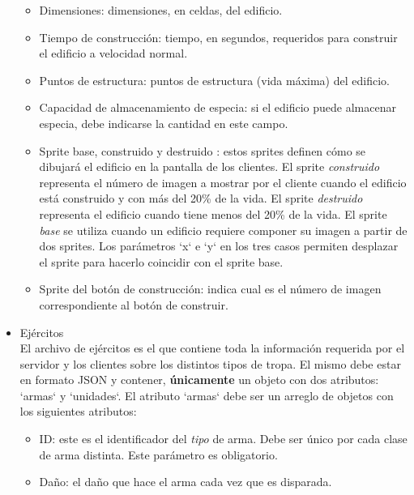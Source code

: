 \documentclass[titlepage,a4paper,12pt]{article}
\begin{document}
\begin{itemize}
\begin{itemize}
\item Dimensiones: dimensiones, en celdas, del edificio.

\item Tiempo de construcción: tiempo, en segundos, requeridos para construir el edificio a velocidad normal.

\item Puntos de estructura: puntos de estructura (vida máxima) del edificio.

\item Capacidad de almacenamiento de especia: si el edificio puede almacenar especia, debe indicarse la cantidad en este campo.

\item Sprite base, construido y destruido : estos sprites definen cómo se dibujará el edificio en la pantalla de los clientes. El sprite \textit{construido} representa el número de imagen a mostrar por el cliente cuando el edificio está construido y con más del 20\% de la vida. El sprite \textit{destruido} representa el edificio cuando tiene menos del 20\% de la vida. El sprite \textit{base} se utiliza cuando un edificio requiere componer su imagen a partir de dos sprites. Los parámetros `x` e `y` en los tres casos permiten desplazar el sprite para hacerlo coincidir con el sprite base.

\item Sprite del botón de construcción: indica cual es el número de imagen correspondiente al botón de construir.

\end{itemize}

\item Ejércitos\\

El archivo de ejércitos es el que contiene toda la información requerida por el servidor y los clientes sobre los distintos tipos de tropa. El mismo debe estar en formato JSON y contener, \textbf{únicamente} un objeto con 
dos atributos: `armas` y `unidades`.  El atributo `armas` debe ser un arreglo de objetos con los siguientes atributos:


\begin{itemize}

\item ID: este es el identificador del \textit{tipo} de arma. Debe ser único por cada clase de arma distinta. Este parámetro es obligatorio.

\item Daño: el daño que hace el arma cada vez que es disparada.



\end{itemize}
\end{itemize}
\end{document}
